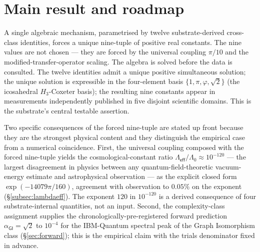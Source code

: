 \documentclass[11pt,a4paper]{amsart}
\theoremstyle{plain}
\theoremstyle{definition}
\begin{document}
\section{Main result and roadmap}

A single algebraic mechanism, parametrised by twelve substrate-derived cross-class identities, forces a unique nine-tuple of positive real constants. The nine values are not chosen --- they are forced by the universal coupling $\pi/10$ and the modified-transfer-operator scaling. The algebra is solved before the data is consulted. The twelve identities admit a unique positive simultaneous solution; the unique solution is expressible in the four-element basis $\{1,\pi,\varphi,\sqrt{2}\}$ (the icosahedral $H_3$-Coxeter basis); the resulting nine constants appear in measurements independently published in five disjoint scientific domains. This is the substrate's central testable assertion.

Two specific consequences of the forced nine-tuple are stated up front because they are the strongest physical content and they distinguish the empirical case from a numerical coincidence. First, the universal coupling composed with the forced nine-tuple yields the cosmological-constant ratio $\Lambda_{\textsf{eff}}/\Lambda_0 \approx 10^{-120}$ --- the largest disagreement in physics between any quantum-field-theoretic vacuum-energy estimate and astrophysical observation --- as the explicit closed form $\exp(-14079\pi/160)$, agreement with observation to $0.05\%$ on the exponent (\S\ref{subsec:lambdaeff}). The exponent $120$ in $10^{-120}$ is a derived consequence of four substrate-internal quantities, not an input. Second, the complexity-class assignment supplies the chronologically-pre-registered forward prediction $\alpha_{\textsf{GI}} = \sqrt{2}$ to $10^{-4}$ for the IBM-Quantum spectral peak of the Graph Isomorphism class (\S\ref{sec:forward}); this is the empirical claim with the trials denominator fixed in advance.
\end{document}
